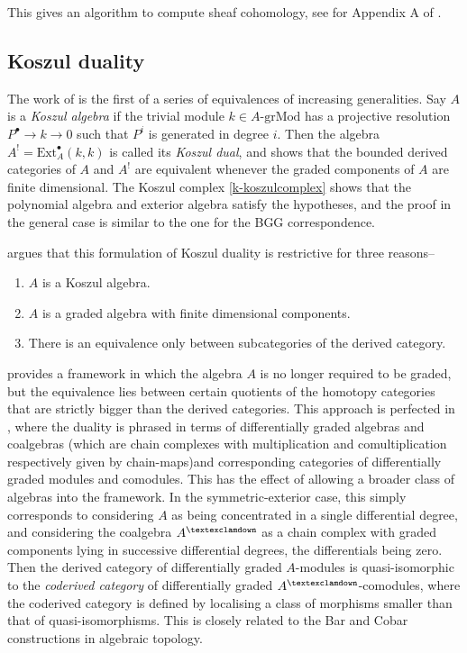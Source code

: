 \documentclass[a4paper]{article}
\theoremstyle{definition}
\theoremstyle{remark}
\newcommand{\grMod}{\ensuremath{\text{-grMod}}}
\newcommand{\gnab}{{\textexclamdown}}
\begin{document}
This gives an algorithm to compute sheaf cohomology, see for Appendix A
of .

\subsection{Koszul duality}
The work of  is the first of a series of
equivalences of increasing generalities. Say \(A\) is a \textit{Koszul algebra}
if the trivial module \(k\in A\grMod\) has a projective resolution  \(P^\bullet \rightarrow k \rightarrow 0\)
such that \(P^i\) is generated in degree \(i\). Then the algebra
\(A^!=\text{Ext}_A^\bullet(k,k)\) is called its \textit{Koszul dual}, and
 shows that the bounded derived categories of
\(A\) and \(A^!\) are equivalent whenever the graded components of \(A\) are
finite dimensional. The Koszul complex \eqref{k-koszulcomplex}
shows that the polynomial algebra and exterior algebra satisfy the hypotheses,
and the proof in the general case is similar to the one for the BGG correspondence.

 argues that this formulation of Koszul duality
is restrictive for three reasons-- 
\begin{enumerate}
    \item \(A\) is a Koszul algebra. 
    \item \(A\) is a graded algebra with finite dimensional components.
    \item There is an equivalence only between subcategories of the
        derived category.
\end{enumerate}
 provides a framework in which the algebra
\(A\) is no longer required to be graded, but the equivalence lies between
certain quotients of the homotopy categories that are strictly bigger than the
derived categories. This approach is perfected in
, where the duality is phrased in terms of
differentially graded algebras and coalgebras (which are chain complexes with
multiplication and comultiplication respectively given by chain-maps)and
corresponding categories of differentially graded modules and comodules. This
has the effect of allowing a broader class of algebras into the framework. In
the symmetric-exterior case, this simply corresponds to considering \(A\) as
being concentrated in a single differential degree, and considering the
coalgebra \(A^\gnab\) as a chain complex with graded components lying in
successive differential degrees, the differentials being zero. Then the derived
category of differentially graded \(A\)-modules is quasi-isomorphic to the
\textit{coderived category} of differentially graded \(A^\gnab\)-comodules,
where the coderived category is defined by localising a class of morphisms
smaller than that of quasi-isomorphisms. This is closely related to the Bar and
Cobar constructions in algebraic topology.


\end{document}
